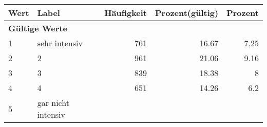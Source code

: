      \begin{longtable}{lXrrr}
     \toprule
     \textbf{Wert} & \textbf{Label} & \textbf{Häufigkeit} & \textbf{Prozent(gültig)} & \textbf{Prozent} \\
     \endhead
     \midrule
     \multicolumn{5}{l}{\textbf{Gültige Werte}}\\

     1 &
     \multicolumn{1}{X}{ sehr intensiv   } &


       \num{761} &
       \num[round-mode=places,round-precision=2]{16,67} &
         \num[round-mode=places,round-precision=2]{7,25} \\

     2 &
     \multicolumn{1}{X}{ 2   } &


       \num{961} &
       \num[round-mode=places,round-precision=2]{21,06} &
         \num[round-mode=places,round-precision=2]{9,16} \\

     3 &
     \multicolumn{1}{X}{ 3   } &


       \num{839} &
       \num[round-mode=places,round-precision=2]{18,38} &
         \num[round-mode=places,round-precision=2]{8} \\

     4 &
     \multicolumn{1}{X}{ 4   } &


       \num{651} &
       \num[round-mode=places,round-precision=2]{14,26} &
         \num[round-mode=places,round-precision=2]{6,2} \\

     5 &
     \multicolumn{1}{X}{ gar nicht intensiv   } &



\end{longtable}
